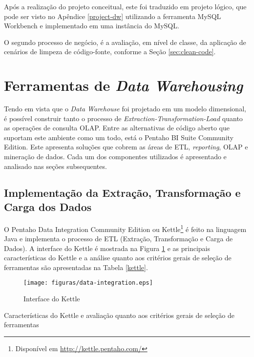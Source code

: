Após a realização do projeto conceitual, este foi traduzido em projeto lógico, que pode ser visto no Apêndice \ref{project-dw} utilizando a ferramenta MySQL Workbench e implementado em uma instância do MySQL.


O segundo processo de negócio, é a avaliação, em nível de classe, da aplicação de cenários de limpeza de código-fonte, conforme a Seção \ref{sec:clean-code}.








\section{Ferramentas de \textit{Data Warehousing}}

Tendo em vista que o \textit{Data Warehouse} foi projetado em um modelo dimensional, é possível construir tanto o processo de \textit{Extraction-Transformation-Load} quanto as operações de consulta OLAP. Entre as alternativas de código aberto que suportam este ambiente como um todo, está o Pentaho BI Suite Community Edition. Este apresenta soluções que cobrem 
as áreas de ETL, \textit{reporting}, OLAP e mineração de dados. Cada um dos componentes utilizados é apresentado e analisado nas seções subsequentes.
 


\subsection{Implementação da Extração, Transformação e Carga dos Dados}
\label{implementação-ETL}
O Pentaho Data Integration Community Edition ou Kettle\footnote{Disponível em \url{http://kettle.pentaho.com/}} é feito na linguagem Java e implementa o processo de ETL (Extração, Transformação e Carga de Dados). A interface do Kettle é mostrada na Figura \ref{pdi} e as principais características do Kettle e a análise quanto aos critérios gerais de seleção de ferramentas são apresentadas na Tabela \ref{kettle}.

\begin{figure}[ht!]
\centering
\texttt{[image: figuras/data-integration.eps]}
\caption{Interface do Kettle}
\label{pdi}
\end{figure}
\FloatBarrier
 

\begin{table}[!ht]

\caption{Características do Kettle e avaliação quanto aos critérios gerais de seleção de ferramentas}
\label{kettle}
\end{table}
\FloatBarrier	

